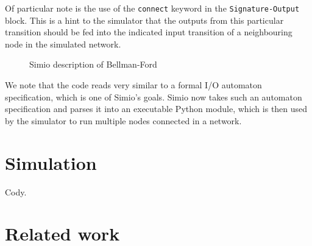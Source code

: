 \documentclass{scrartcl}
\def \kw#1{\texttt{\color{MidnightBlue}#1}}
\def \self {\texttt{\color{Cerulean}self}}
\def \py#1{\texttt{\color{LimeGreen}#1}}
\def \pyval#1{\texttt{\color{Sepia}#1}}
\begin{document}
Of particular note is the use of the \kw{connect} keyword in the
\kw{Signature-Output} block. This is a hint to the simulator that the outputs
from this particular transition should be fed into the indicated input
transition of a neighbouring node in the simulated network.

\begin{figure}\label{alg:1}
\caption{Simio description of Bellman-Ford}
\end{figure}

We note that the code reads very similar to a formal I/O automaton
specification, which is one of Simio's goals. Simio now takes such an automaton
specification and parses it into an executable Python module, which is then
used by the simulator to run multiple nodes connected in a network.

\section{Simulation}

Cody.

\section{Related work}
\end{document}
